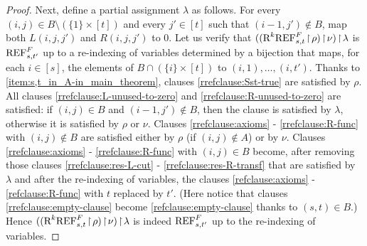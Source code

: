 \documentclass[10pt,a4paper]{article}
\theoremstyle{remark}
\newtheorem*{switching lemma}{Switching Lemma}
\newtheorem*{open problem}{Open Problem}
\theoremstyle{definition}
\begin{document}
\begin{proof}
Next, define a partial assignment $\lambda$ as follows. For every $(i,j) \in B \setminus (\{1\} \times [t])$ and every $j' \in [t]$ such that $(i-1,j') \not \in B$, map both $L(i,j,j')$ and $R(i,j,j')$ to 0. 
Let us verify that $((\textnormal{R}^k\textnormal{REF}^{F}_{s,t} \! \restriction \! \rho) \! \restriction \! \nu) \! \restriction \! \lambda$ is $\textnormal{REF}^{F}_{s,t'}$ up to a re-indexing of variables determined by a bijection that maps, for each $i \in [s]$, the elements of $B \cap (\{i\} \times [t])$ to $(i,1),\ldots, (i,t')$. Thanks to \ref{item:s,t_in_A-in_main_theorem}, clauses \eqref{rrefclause:Sst-true} are satisfied by $\rho$. All clauses \eqref{rrefclause:L-unused-to-zero} and \eqref{rrefclause:R-unused-to-zero} are satisfied: if $(i,j) \in B$ and $(i-1,j') \notin B$, then the clause is satisfied by $\lambda$, otherwise it is satisfied by $\rho$ or $\nu$. Clauses \eqref{rrefclause:axioms} - \eqref{rrefclause:R-func} with $(i,j) \notin B$ are satisfied either by $\rho$ (if $(i,j) \notin A$) or by $\nu$. Clauses \eqref{rrefclause:axioms} - \eqref{rrefclause:R-func} with $(i,j) \in B$ become, after removing those clauses \eqref{rrefclause:res-L-cut} - \eqref{rrefclause:res-R-transf} that are satisfied by $\lambda$ and after the re-indexing of variables, the clauses \eqref{refclause:axioms} - \eqref{refclause:R-func} with $t$ replaced by $t'$. (Here notice that clauses \eqref{rrefclause:empty-clause} become \eqref{refclause:empty-clause} thanks to $(s,t) \in B$.) Hence $((\textnormal{R}^k\textnormal{REF}^{F}_{s,t} \! \restriction \! \rho) \! \restriction \! \nu) \! \restriction \! \lambda$ is indeed $\textnormal{REF}^{F}_{s,t'}$ up to the re-indexing of variables. 


\end{proof}
\end{document}
